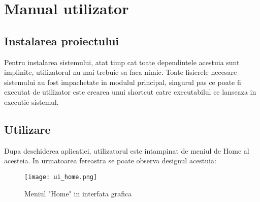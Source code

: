 
 \chapter{Manual utilizator}

\label{cap:user-manual}
%
%
%

\section{Instalarea proiectului}

Pentru instalarea sistemului, atat timp cat toate dependintele acestuia sunt implinite, utilizatorul nu mai trebuie sa faca nimic. Toate fisierele necesare sistemului au fost impachetate in modulul principal, singurul pas ce poate fi executat de utilizator este crearea unui shortcut catre executabilul ce lanseaza in executie sistemul.
\section{Utilizare}

Dupa deschiderea aplicatiei, utilizatorul este intampinat de meniul de Home al acesteia. In urmatoarea fereastra se poate observa designul acestuia: 

\begin{figure}[h]
	\centering
	\texttt{[image: ui\_home.png]}
	\caption{Meniul "Home" in interfata grafica}
	\label{fig:ui_home}
\end{figure}

